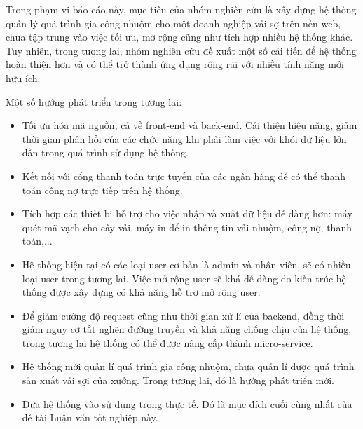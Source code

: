 Trong phạm vi báo cáo này, mục tiêu của nhóm nghiên cứu là xây dựng hệ thống quản lý quá trình gia công nhuộm cho một doanh nghiệp vải sợ trên nền web, chưa tập trung vào việc tối ưu, mở rộng cũng như tích hợp nhiều hệ thống khác. Tuy nhiên, trong tương lai, nhóm nghiên cứu đề xuất một số cải tiến để hệ thống hoàn thiện hơn và có thể trở thành
ứng dụng rộng rãi với nhiều tính năng mới hữu ích.\par

Một số hướng phát triển trong tương lai:
\begin{itemize}
    \item Tối ưu hóa mã nguồn, cả về front-end và back-end. Cải thiện hiệu năng, giảm thời gian phản hồi của các chức năng khi phải làm việc với khói dữ liệu lớn dần trong quá trình sử dụng hệ thống.
    \item Kết nối với cổng thanh toán trực tuyến của các ngân hàng để có thể thanh toán công nợ trực tiếp trên hệ thống.
    \item Tích hợp các thiết bị hỗ trợ cho việc nhập và xuất dữ liệu dễ dàng hơn: máy quét mã vạch cho cây vải, máy in để in thông tin vải nhuộm, công nợ, thanh toán,...
    \item Hệ thống hiện tại có các loại user cơ bản là admin và nhân viên, sẽ có nhiều loại user trong tương lai. Việc mở rộng user sẽ khá dễ dàng do kiến trúc hệ thống được xây dựng có khả năng hỗ trợ mở rộng user.
    \item Để giảm cường độ request cũng như thời gian xử lí của backend, đồng thời giảm nguy cơ tắt nghẽn đường truyền và khả năng chống chịu của hệ thống, trong tương lai hệ thống có thể được nâng cấp thành micro-service.
    \item Hệ thống mới quản lí quá trình gia công nhuộm, chưa quản lí được quá trình sản xuất vải sợi của xưởng. Trong tương lai, đó là hướng phát triển mới.
    \item Đưa hệ thống vào sử dụng trong thực tế. Đó là mục đích cuối cùng nhất của đề tài Luận văn tốt nghiệp này.
\end{itemize}
